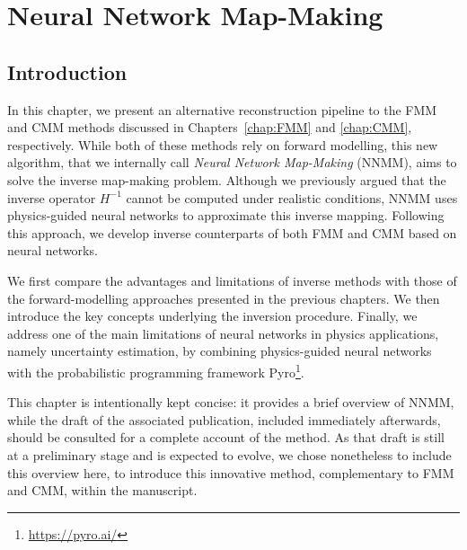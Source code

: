 \documentclass[../../thesis.tex]{subfiles}
\begin{document}
\chapter{Neural Network Map-Making} \label{chap:NNMM}
\ifSubfilesClassLoaded{
    \tableofcontents
}{
    \minitoc
}

\section*{Introduction}

In this chapter, we present an alternative reconstruction pipeline to the FMM and CMM methods discussed in Chapters~\ref{chap:FMM} and \ref{chap:CMM}, respectively. While both of these methods rely on forward modelling, this new algorithm, that we internally call \emph{Neural Network Map-Making} (NNMM), aims to solve the inverse map-making problem. Although we previously argued that the inverse operator $H^{-1}$ cannot be computed under realistic conditions, NNMM uses physics-guided neural networks to approximate this inverse mapping. Following this approach, we develop inverse counterparts of both FMM and CMM based on neural networks.

We first compare the advantages and limitations of inverse methods with those of the forward-modelling approaches presented in the previous chapters. We then introduce the key concepts underlying the inversion procedure. Finally, we address one of the main limitations of neural networks in physics applications, namely uncertainty estimation, by combining physics-guided neural networks with the probabilistic programming framework Pyro\footnote{\url{https://pyro.ai/}}.

This chapter is intentionally kept concise: it provides a brief overview of NNMM, while the draft of the associated publication, included immediately afterwards, should be consulted for a complete account of the method. As that draft is still at a preliminary stage and is expected to evolve, we chose nonetheless to include this overview here, to introduce this innovative method, complementary to FMM and CMM, within the manuscript.\\

\end{document}
